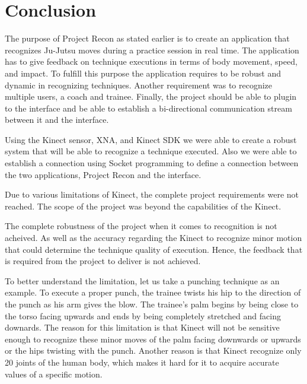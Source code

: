\chapter{Conclusion}\label{chap:concl}
The purpose of Project Recon as stated earlier is to create an application that recognizes Ju-Jutsu moves during a practice session in real time. The application has to give feedback on technique executions in terms of body movement, speed, and impact. To fulfill this purpose the application requires to be robust and dynamic in recognizing techniques. Another requirement was to recognize multiple users, a coach and trainee. Finally, the project should be able to plugin to the interface and be able to establish a bi-directional communication stream between it and the interface.

Using the Kinect sensor, XNA, and Kinect SDK we were able to create a robust system that will be able to recognize a technique executed. Also we were able to establish a connection using Socket programming to define a connection between the two applications, Project Recon and the interface.

Due to various limitations of Kinect, the complete project requirements were not reached. The scope of the project was beyond the capabilities of the Kinect.

The complete robustness of the project when it comes to recognition is not acheived. As well as the accuracy regarding the Kinect to recognize minor motion that could determine the technique quality of execution. Hence, the feedback that is required from the project to deliver is not achieved.

To better understand the limitation, let us take a punching technique as an example. To execute a proper punch, the trainee twists his hip to the direction of the punch as his arm gives the blow. The trainee's palm begins by being close to the torso facing upwards and ends by being completely stretched and facing downards. The reason for this limitation is that Kinect will not be sensitive enough to recognize these minor moves of the palm facing downwards or upwards or the hips twisting with the punch. Another reason is that Kinect recognize only 20 joints of the human body, which makes it hard for it to acquire accurate values of a specific motion.